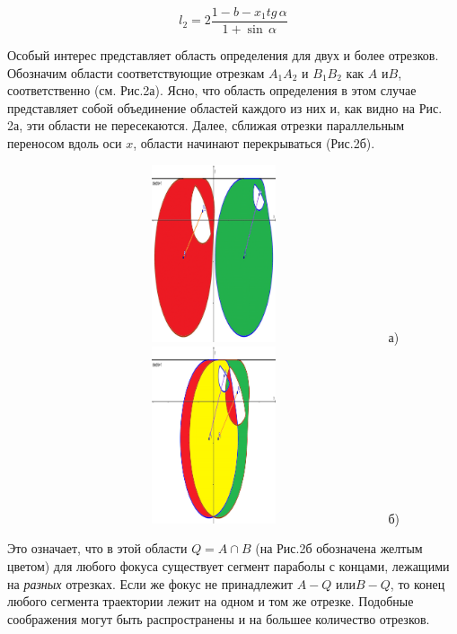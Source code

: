 \documentclass[a4paper]{article}
\begin{document}
\begin{equation} \label{GrindEQ__4_} l_{2} =2\frac{1-b-x_{1} tg\, \alpha }{1+\sin \, \alpha }  \end{equation}

Особый интерес представляет область определения для двух и более отрезков. Обозначим области соответствующие отрезкам $A_{1} A_{2} $ и $B_{1} B_{2} $ как $A$ и$B$, соответственно (см. Рис.2а). Ясно, что область определения в этом случае представляет собой объединение областей каждого из них и, как видно на Рис. 2а, эти области не пересекаются. Далее, сближая отрезки  параллельным переносом вдоль оси $x$, области начинают перекрываться (Рис.2б).

\begin{figure}[ht]
  \centering
  \includegraphics[width=100.5mm, height=52.2mm, viewport=3mm 4mm 205mm 292mm]{image6} а)\\
  \includegraphics[width=100.5mm, height=52.2mm, viewport=3mm 4mm 205mm 292mm]{image7} б)\\
  \caption{}\label{image6_7}
\end{figure}

Это означает, что в этой области $Q=A\cap B$ (на Рис.2б обозначена желтым цветом) для любого фокуса существует сегмент параболы с концами, лежащими на \textit{разных} отрезках. Если же фокус не принадлежит $A-Q$ или$B-Q$, то конец любого сегмента траектории лежит на одном и том же отрезке. Подобные соображения могут быть распространены и на большее количество отрезков.
\end{document}
